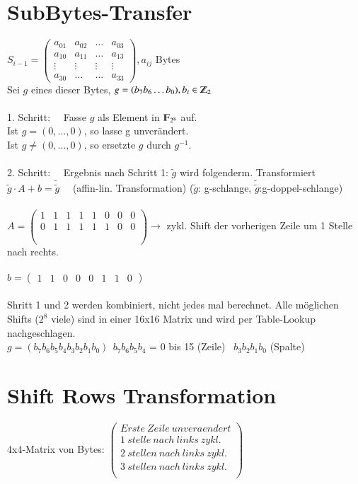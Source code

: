 \section{SubBytes-Transfer}
$S_{i-1} =
\begin{pmatrix}
	a_{01} & a_{02} & \ldots & a_{03} \\
	a_{10} & a_{11} & \ldots & a_{13}\\
	\vdots & \vdots  & \vdots & \vdots \\
	a_{30} & \ldots  & \ldots & a_{33}
\end{pmatrix} , a_{ij}$ Bytes\\
Sei $g$ eines dieser Bytes, $g = (b_7b_6\ldots b_0), b_i \in \Z_2$\\
\\
1. Schritt: \ \
Fasse $g$ als Element in $\F_{2^8}$ auf.\\
\indent Ist $g = (0, \ldots, 0)$, so lasse g unver\"andert.\\
\indent Ist $g \neq (0, \ldots, 0)$, so ersetzte $g$ durch $g^{-1}$.\\
\\
2. Schritt: \ \ Ergebnis nach Schritt 1: $\tilde{g}$ wird folgenderm. Transformiert\\
\indent $\tilde{g} \cdot A + b = \tilde{\tilde{g}}$ \ \ (affin-lin. Transformation)
($\tilde{g}$: g-schlange, $\tilde{\tilde{g}}$:g-doppel-schlange)\\
\\
$A = 
\begin{pmatrix}
	1 & 1 & 1 & 1 & 1& 0 & 0 & 0\\
	0 & 1 & 1 & 1 & 1& 1 & 0 & 0\\
	\\
	\\
\end{pmatrix} \rightarrow$ zykl. Shift der vorherigen Zeile um 1 Stelle nach rechts.\\
\\
$b = \begin{pmatrix}
	1 & 1 & 0 & 0 & 0 & 1 & 1 & 0
\end{pmatrix}$\\
\\
Shritt 1 und 2 werden kombiniert, nicht jedes mal berechnet. Alle m\"oglichen Shifts ($2^8$ viele) sind in einer 16x16 Matrix und wird per Table-Lookup nachgeschlagen.\\
$g = (b_7b_6b_5b_4b_3b_2b_1b_0) \ \  b_7b_6b_5b_4$ = 0 bis 15 (Zeile) \ $b_3b_2b_1b_0$ (Spalte)

\section{Shift Rows Transformation}
4x4-Matrix von Bytes: 
$\begin{pmatrix}
	Erste\ Zeile\ unveraendert\\
	1\ stelle\ nach\ links\ zykl.\\
	2\ stellen\ nach\ links\ zykl.\\
	3\ stellen\ nach\ links\ zykl.\\
\end{pmatrix}$

